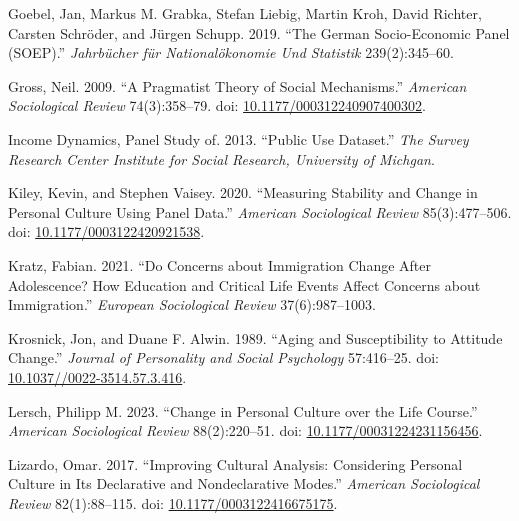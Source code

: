 \documentclass[
  12pt,
]{article}
\newlength{\cslhangindent}
\newlength{\cslentryspacingunit} %
\newenvironment{CSLReferences}[2] %
 {%
  \setlength{\parindent}{0pt}
  \ifodd #1
  \let\oldpar\par
  \def\par{\hangindent=\cslhangindent\oldpar}
  \fi
  \setlength{\parskip}{#2\cslentryspacingunit}
 }%
 {}
\begin{document}
\begin{CSLReferences}{1}{0}
\leavevmode{}%
Goebel, Jan, Markus M. Grabka, Stefan Liebig, Martin Kroh, David
Richter, Carsten Schröder, and Jürgen Schupp. 2019. {``The German
Socio-Economic Panel (SOEP).''} \emph{Jahrb{ü}cher f{ü}r
National{ö}konomie Und Statistik} 239(2):345--60.

\leavevmode{}%
Gross, Neil. 2009. {``A {Pragmatist} {Theory} of {Social}
{Mechanisms}.''} \emph{American Sociological Review} 74(3):358--79. doi:
\href{https://doi.org/10.1177/000312240907400302}{10.1177/000312240907400302}.

\leavevmode{}%
Income Dynamics, Panel Study of. 2013. {``Public Use Dataset.''}
\emph{The Survey Research Center Institute for Social Research,
University of Michgan}.

\leavevmode{}%
Kiley, Kevin, and Stephen Vaisey. 2020. {``Measuring {Stability} and
{Change} in {Personal} {Culture} {Using} {Panel} {Data}.''}
\emph{American Sociological Review} 85(3):477--506. doi:
\href{https://doi.org/10.1177/0003122420921538}{10.1177/0003122420921538}.

\leavevmode{}%
Kratz, Fabian. 2021. {``Do Concerns about Immigration Change After
Adolescence? How Education and Critical Life Events Affect Concerns
about Immigration.''} \emph{European Sociological Review}
37(6):987--1003.

\leavevmode{}%
Krosnick, Jon, and Duane F. Alwin. 1989. {``Aging and {Susceptibility}
to {Attitude} {Change}.''} \emph{Journal of Personality and Social
Psychology} 57:416--25. doi:
\href{https://doi.org/10.1037//0022-3514.57.3.416}{10.1037//0022-3514.57.3.416}.

\leavevmode{}%
Lersch, Philipp M. 2023. {``Change in {Personal} {Culture} over the
{Life} {Course}.''} \emph{American Sociological Review} 88(2):220--51.
doi:
\href{https://doi.org/10.1177/00031224231156456}{10.1177/00031224231156456}.

\leavevmode{}%
Lizardo, Omar. 2017. {``Improving {Cultural} {Analysis}: {Considering}
{Personal} {Culture} in Its {Declarative} and {Nondeclarative}
{Modes}.''} \emph{American Sociological Review} 82(1):88--115. doi:
\href{https://doi.org/10.1177/0003122416675175}{10.1177/0003122416675175}.


\end{CSLReferences}
\end{document}
